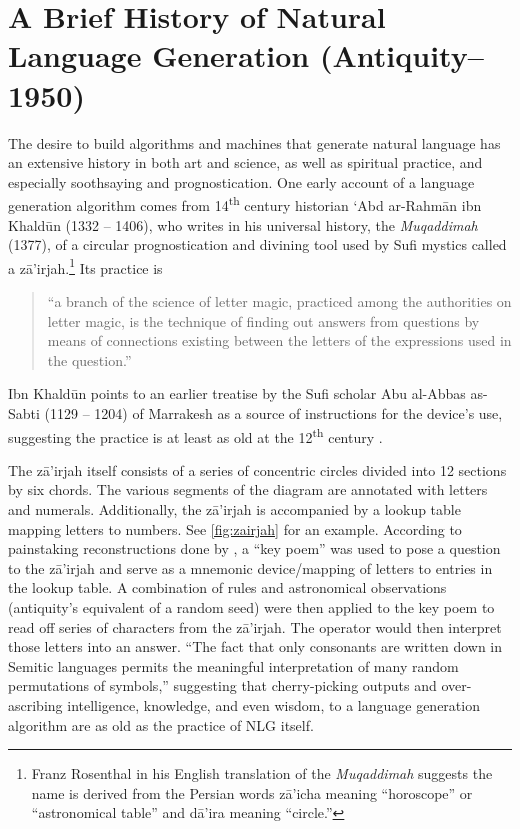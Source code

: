 \section{A Brief History of Natural Language Generation (Antiquity--1950)}
 
The desire to build algorithms and machines that generate natural
language has an extensive history in both art and science, as well as
spiritual practice, and especially soothsaying and prognostication.  One early
account of a language generation algorithm comes from 14\textsuperscript{th}
century historian `Abd ar-Rahm\={a}n ibn Khald\={u}n (1332 -- 1406), who
writes in his universal history, the \textit{Muqaddimah} (1377), of a circular
prognostication and divining tool  used by Sufi mystics called a
z\={a}'irjah.\footnote{Franz Rosenthal in his English translation of the
    \textit{Muqaddimah} suggests the name is derived from the Persian words
    z\={a}'icha meaning ``horoscope'' or  ``astronomical table'' and
d\={a}'ira meaning ``circle.''} Its practice is \begin{quote} ``a branch of
    the science of letter magic, practiced among the authorities on letter
    magic, is the technique of finding out answers from questions by means of
connections existing between the letters of the expressions used in the
question.''\end{quote}

Ibn Khald\={u}n points to an earlier treatise by the Sufi scholar Abu al-Abbas
as-Sabti (1129 -- 1204) of Marrakesh as a source of instructions for the
device's use, suggesting the practice is at least as old at the
12\textsuperscript{th} century \citep{rosenthal1958muqaddimah}.


 
The z\={a}'irjah itself consists of a series of concentric circles divided
into 12 sections by six chords. The various segments of the diagram are
annotated with letters and numerals. Additionally, the z\={a}'irjah is
accompanied by a lookup table mapping letters to numbers. See
\autoref{fig:zairjah} for an example. According to painstaking reconstructions
done by \cite{link2010variantology}, a ``key poem'' was used to pose a
question to the z\={a}'irjah and serve as a mnemonic device/mapping of letters
to entries in the lookup table.  A combination of rules and astronomical
observations (antiquity's equivalent of a random seed) were then applied to
the key poem to read off series of characters from the z\={a}'irjah. The
operator would then interpret those letters into an answer.  ``The fact that
only consonants are written down in Semitic languages permits the meaningful
interpretation of many random permutations of symbols,''
\citep{link2010variantology} suggesting that cherry-picking outputs and
over-ascribing intelligence, knowledge, and even wisdom, to a language
generation algorithm are as old as the practice of NLG itself.
  
